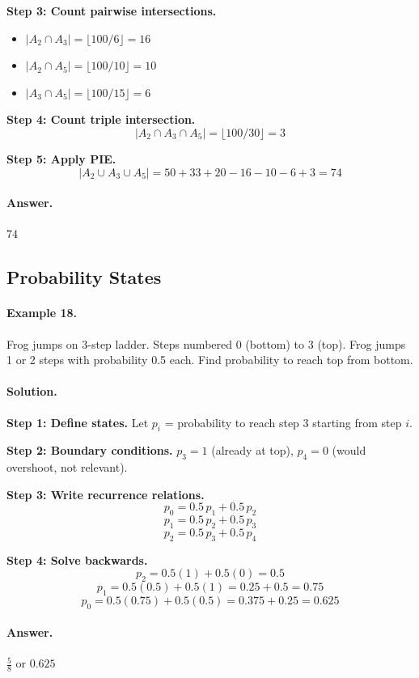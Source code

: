 \documentclass[12pt]{extarticle}
\begin{document}
\textbf{Step 3: Count pairwise intersections.}
\begin{itemize}
    \item $|A_2 \cap A_3| = \lfloor 100/6 \rfloor = 16$
    \item $|A_2 \cap A_5| = \lfloor 100/10 \rfloor = 10$
    \item $|A_3 \cap A_5| = \lfloor 100/15 \rfloor = 6$
\end{itemize}

\textbf{Step 4: Count triple intersection.}
\[
|A_2 \cap A_3 \cap A_5| = \lfloor 100/30 \rfloor = 3
\]

\textbf{Step 5: Apply PIE.}
\[
|A_2\cup A_3\cup A_5| = 50+33+20 -16-10-6 +3 = 74
\]

\paragraph{Answer.} $\boxed{74}$

\subsection{Probability States}

\paragraph{Example 18.} Frog jumps on 3-step ladder. Steps numbered 0 (bottom) to 3 (top). Frog jumps 1 or 2 steps with probability 0.5 each. Find probability to reach top from bottom.

\paragraph{Solution.}
\textbf{Step 1: Define states.} Let $p_i$ = probability to reach step 3 starting from step $i$.

\textbf{Step 2: Boundary conditions.} $p_3=1$ (already at top), $p_4=0$ (would overshoot, not relevant).

\textbf{Step 3: Write recurrence relations.}
\[
p_0 = 0.5\,p_1 + 0.5\,p_2
\]
\[
p_1 = 0.5\,p_2 + 0.5\,p_3
\]
\[
p_2 = 0.5\,p_3 + 0.5\,p_4
\]

\textbf{Step 4: Solve backwards.}
\[
p_2 = 0.5(1) + 0.5(0) = 0.5
\]
\[
p_1 = 0.5(0.5) + 0.5(1) = 0.25 + 0.5 = 0.75
\]
\[
p_0 = 0.5(0.75) + 0.5(0.5) = 0.375 + 0.25 = 0.625
\]

\paragraph{Answer.} $\boxed{\frac{5}{8}}$ or $0.625$
\end{document}
